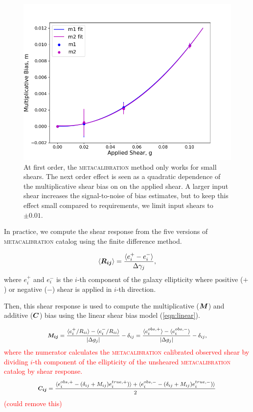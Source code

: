 \documentclass[fleqn,usenatbib]{mnras}
\begin{document}
\begin{figure}
	\includegraphics[width=\columnwidth]{metacal_bias_shear.png}
    \vspace*{-5mm}
    \caption{At first order, the \textsc{metacalibration} method only works for small shears. The next order effect is seen as a quadratic dependence of the multiplicative shear bias on on the applied shear. A larger input shear increases the signal-to-noise of bias estimates, but to keep this effect small compared to requirements, we limit input shears to $\pm 0.01$.}
    \label{fig:metacal_shear_linear}
\end{figure}


In practice, we compute the shear response from the five versions of \textsc{metacalibration} catalog using the finite difference method. 

\begin{equation}
    \langle\vb*{R_{ij}}\rangle = 
    \frac{\langle e^{+}_{i} - e^{-}_{i} \rangle}{\Delta\gamma_{j}}, 
\end{equation}
where $e^{+}_{i}$ and $e^{-}_{i}$ is the $i$-th component of the galaxy ellipticity where positive ($+$) or negative ($-$) shear is applied in $i$-th direction. 


Then, this shear response is used to compute the multiplicative ($\vb*{M}$) and additive ($\vb*{C}$) bias using the linear shear bias model (\ref{eqn:linear}). 

\textcolor{red}{
\begin{equation}
    \small
    \vb*{M_{ij}} = 
    \frac{\langle e^{+}_{i}/R_{ii} \rangle - \langle e^{-}_{i}/R_{ii} \rangle}{\abs{\Delta g_{j}}} - \delta_{ij} 
    = \frac{\langle e^{obs,+}_{i}\rangle - \langle e^{obs,-}_{i}\rangle}{\abs{\Delta g_{j}}} - \delta_{ij}, 
\end{equation}
where the numerator calculates the \textsc{metacalibration} calibrated observed shear by dividing $i$-th component of the ellipticity of the unsheared \textsc{metacalibration} catalog by shear response.
\begin{equation}
    \small
    \vb*{C_{ij}} = \frac{\langle e^{obs,+}_{i} - (\delta_{ij}+M_{ij})e^{true,+}_{i})\rangle + \langle e^{obs,-}_{i} - (\delta_{ij}+M_{ij})e^{true,-}_{i}) \rangle}{2}
\end{equation}
 (could remove this)}
 
\end{document}
